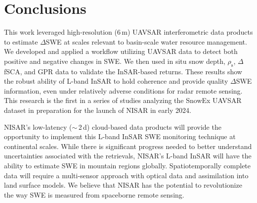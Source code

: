 \hypertarget{ch4-discussion-3}{\section{Conclusions}\label{ch4-discussion-3}}


This work leveraged high-resolution (6\,m) UAVSAR interferometric data products to estimate $\Delta$SWE at scales relevant to basin-scale water resource management. We developed and applied a workflow utilizing UAVSAR data to detect both positive and negative changes in SWE. We then used in situ snow depth, $\rho_\mathrm{s}$, $\Delta$fSCA, and GPR data to validate the InSAR-based returns. These results show the robust ability of L-band InSAR to hold coherence and provide quality $\Delta$SWE information, even under relatively adverse conditions for radar remote sensing. This research is the first in a series of studies analyzing the SnowEx UAVSAR dataset in preparation for the launch of NISAR in early 2024.

NISAR's low-latency ($\sim$\,2\,d) cloud-based data products will provide the opportunity to implement this L-band InSAR SWE monitoring technique at continental scales. While there is significant progress needed to better understand uncertainties associated with the retrievals, NISAR's L-band InSAR will have the ability to estimate SWE in mountain regions globally. Spatiotemporally complete data will require a multi-sensor approach with optical data and assimilation into land surface models. We believe that NISAR has the potential to revolutionize the way SWE is measured from spaceborne remote sensing.




